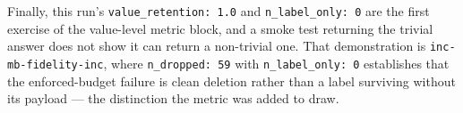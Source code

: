 \documentclass[11pt]{article}
\begin{document}
Finally, this run's \texttt{value\_retention: 1.0} and \texttt{n\_label\_only: 0} are the
first exercise of the value-level metric block, and a smoke test returning the trivial answer
does not show it can return a non-trivial one. That demonstration is
\texttt{inc-mb-fidelity-inc}, where \texttt{n\_dropped: 59} with \texttt{n\_label\_only: 0}
establishes that the enforced-budget failure is clean deletion rather than a label surviving
without its payload --- the distinction the metric was added to draw.
\end{document}
